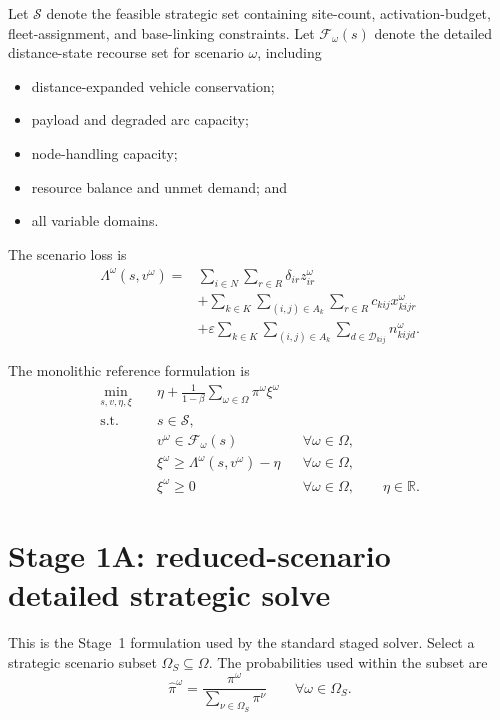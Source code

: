 \documentclass[11pt]{article}
\newcommand{\R}{\mathbb{R}}
\begin{document}
Let $\mathcal S$ denote the feasible strategic set containing site-count,
activation-budget, fleet-assignment, and base-linking constraints.  Let
$\mathcal F_\omega(s)$ denote the detailed distance-state recourse set for
scenario $\omega$, including
\begin{itemize}[nosep]
\item distance-expanded vehicle conservation;
\item payload and degraded arc capacity;
\item node-handling capacity;
\item resource balance and unmet demand; and
\item all variable domains.
\end{itemize}

The scenario loss is
\begin{align}
\Lambda^\omega(s,v^\omega)
=
&\sum_{i\in N}\sum_{r\in R}
\delta_{ir}z^\omega_{ir}
\nonumber\\
&+\sum_{k\in K}\sum_{(i,j)\in A_k}\sum_{r\in R}
c_{kij}x^\omega_{kijr}
\nonumber\\
&+\varepsilon
\sum_{k\in K}\sum_{(i,j)\in A_k}
\sum_{d\in\mathcal D_{kij}}n^\omega_{kijd}.
\label{eq:full-loss}
\end{align}

The monolithic reference formulation is
\begin{align}
\min_{s,v,\eta,\xi}\quad
&\eta+
\frac{1}{1-\beta}
\sum_{\omega\in\Omega}\pi^\omega\xi^\omega
\label{eq:monolithic-objective}\\
\text{s.t.}\quad
&s\in\mathcal S,
\label{eq:monolithic-strategic}\\
&v^\omega\in\mathcal F_\omega(s)
&&\forall\omega\in\Omega,
\label{eq:monolithic-recourse}\\
&\xi^\omega\geq
\Lambda^\omega(s,v^\omega)-\eta
&&\forall\omega\in\Omega,
\label{eq:monolithic-cvar}\\
&\xi^\omega\geq0
&&\forall\omega\in\Omega,
\qquad \eta\in\R.
\end{align}

\section{Stage 1A: reduced-scenario detailed strategic solve}

This is the Stage~1 formulation used by the standard staged solver.  Select a
strategic scenario subset $\Omega_S\subseteq\Omega$.  The probabilities used
within the subset are
\begin{equation}
\widehat\pi^\omega
=
\frac{\pi^\omega}
{\sum_{\nu\in\Omega_S}\pi^\nu}
\qquad \forall\omega\in\Omega_S.
\label{eq:renormalized-probability}
\end{equation}
\end{document}

